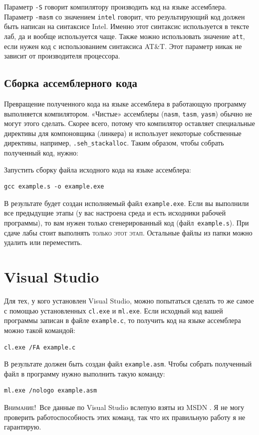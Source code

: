 \documentclass[a4paper,oneside,DIV=12,12pt]{scrartcl}
\newcommand{\progname}[1]{\texttt{#1}}
\newcommand{\allcaps}[1]{%
	{\addfontfeatures{LetterSpace = 5}#1}%
}
\newcommand{\emphsc}[1]{\textsc{#1}}
\newcommand{\Attention}[1]{\noindent\textsc{Внимание!}~#1\par}
\begin{document}
			Параметр \verb|-S| говорит компилятору производить код на языке ассемблера. Параметр \verb|-masm| со значением \verb|intel| говорит, что результирующий код должен быть написан на синтаксисе Intel. Именно этот синтаксис используется в тексте лаб, да и вообще используется чаще. Также можно использовать значение \texttt{att}, если нужен код с использованием синтаксиса AT\&T. Этот параметр никак не зависит от производителя процессора.
			
		\subsection{Сборка ассемблерного кода}
			Превращение полученного кода на языке ассемблера в работающую программу выполняется компилятором. «Чистые» ассемблеры (\progname{nasm}, \progname{tasm}, \progname{yasm}) обычно не могут этого сделать. Скорее всего, потому что компилятор оставляет специальные директивы для компоновщика (линкера) и использует некоторые собственные директивы, например, \verb|.seh_stackalloc|. Таким образом, чтобы собрать полученный код, нужно:
			\begin{steps}
				\item Запустить сборку файла исходного кода на языке ассемблера:
				\begin{verbatim}
gcc example.s -o example.exe
				\end{verbatim}
			\end{steps}
			В результате будет создан исполняемый файл \verb|example.exe|. Если вы выполнили все предыдущие этапы (у вас настроена среда и есть исходники рабочей программы), то вам нужен только сгенерированный код (файл~\verb|example.s|). При сдаче лабы стоит выполнять \emphsc{только этот этап.} Остальные файлы из папки можно удалить или переместить.
			
	\section{Visual Studio}
		Для тех, у кого установлен Visual Studio, можно попытаться сделать то же самое с помощью установленных \verb|cl.exe| и \verb|ml.exe|. Если исходный код вашей программы записан в файле \verb|example.c|, то получить код на языке ассемблера можно такой командой:
		\begin{verbatim}
cl.exe /FA example.c
		\end{verbatim}
		В результате должен быть создан файл \verb|example.asm|. Чтобы собрать полученный файл в программу нужно выполнить такую команду:
		\begin{verbatim}
ml.exe /nologo example.asm
		\end{verbatim}
		
		\Attention{Все данные по Visual Studio вслепую взяты из \allcaps{MSDN}. Я не могу проверить работоспособность этих команд, так что их правильную работу я не гарантирую.}
\end{document}
